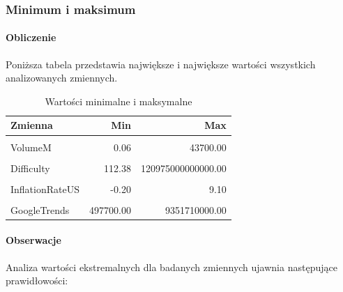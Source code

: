\documentclass[
  11pt,
]{article}
\begin{document}
\pagebreak

\subsubsection{Minimum i maksimum}\label{minimum-i-maksimum}

\paragraph{\texorpdfstring{Obliczenie
\newline}{Obliczenie }}\label{obliczenie-2}

Poniższa tabela przedstawia największe i największe wartości wszystkich
analizowanych zmiennych.

\begin{table}[!h]
\centering
\caption{\label{tab:unnamed-chunk-6}Wartości minimalne i maksymalne}
\centering
\begin{tabular}[t]{lrr}
\toprule
Zmienna & Min & Max\\
\midrule
\cellcolor{gray!10}{Price} & \cellcolor{gray!10}{0.10} & \cellcolor{gray!10}{103293.40}\\
VolumeM & 0.06 & 43700.00\\
\cellcolor{gray!10}{USAvgKWHPrice} & \cellcolor{gray!10}{0.12} & \cellcolor{gray!10}{0.18}\\
Difficulty & 112.38 & 120975000000000.00\\
\cellcolor{gray!10}{BTCCirculation} & \cellcolor{gray!10}{3561446.00} & \cellcolor{gray!10}{19857514.00}\\
\addlinespace
InflationRateUS & -0.20 & 9.10\\
\cellcolor{gray!10}{HasMuskMentioned} & \cellcolor{gray!10}{0.00} & \cellcolor{gray!10}{5.00}\\
GoogleTrends & 497700.00 & 9351710000.00\\
\bottomrule
\end{tabular}
\end{table}

\paragraph{Obserwacje}\label{obserwacje-5}

Analiza wartości ekstremalnych dla badanych zmiennych ujawnia
następujące prawidłowości:
\end{document}
